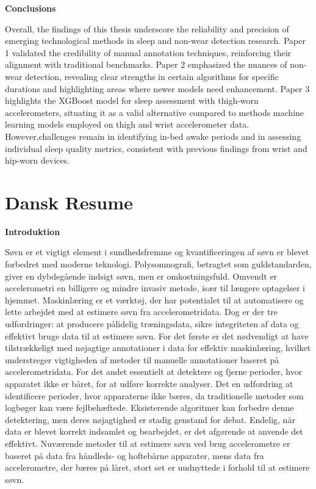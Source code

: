 \documentclass[
  9pt,
]{scrbook}
\begin{document}
\textbf{Conclusions}

Overall, the findings of this thesis underscore the reliability and
precision of emerging technological methods in sleep and non-wear
detection research. Paper 1 validated the credibility of manual
annotation techniques, reinforcing their alignment with traditional
benchmarks. Paper 2 emphasized the nuances of non-wear detection,
revealing clear strengths in certain algorithms for specific durations
and highlighting areas where newer models need enhancement. Paper 3
highlights the XGBoost model for sleep assessment with thigh-worn
accelerometers, situating it as a valid alternative compared to methods
machine learning models employed on thigh and wrist accelerometer data.
However,challenges remain in identifying in-bed awake periods and in
assessing individual sleep quality metrics, consistent with previous
findings from wrist and hip-worn devices.

\hypertarget{dansk-resume}{%
\chapter{Dansk Resume}\label{dansk-resume}}

\textbf{Introduktion}

Søvn er et vigtigt element i sundhedsfremme og kvantificeringen af søvn
er blevet forbedret med moderne teknologi. Polysomnografi, betragtet som
guldstandarden, giver en dybdegående indsigt søvn, men er
omkostningsfuld. Omvendt er accelerometri en billigere og mindre invasiv
metode, især til længere optagelser i hjemmet. Maskinlæring er et
værktøj, der har potentialet til at automatisere og lette arbejdet med
at estimere søvn fra accelerometridata. Dog er der tre udfordringer: at
producere pålidelig træningsdata, sikre integriteten af data og
effektivt bruge data til at estimere søvn. For det første er det
nødvendigt at have tilstrækkeligt med nøjagtige annotationer i data for
effektiv maskinlæring, hvilket understreger vigtigheden af metoder til
manuelle annotationer baseret på accelerometridata. For det andet
essentielt at detektere og fjerne perioder, hvor apparatet ikke er
båret, for at udføre korrekte analyser. Det en udfordring at
identificere perioder, hvor apparaterne ikke bæres, da traditionelle
metoder som logbøger kan være fejlbehæftede. Eksisterende algoritmer kan
forbedre denne detektering, men deres nøjagtighed er stadig genstand for
debat. Endelig, når data er blevet korrekt indsamlet og bearbejdet, er
det afgørende at anvende det effektivt. Nuværende metoder til at
estimere søvn ved brug accelerometre er baseret på data fra håndleds- og
hoftebårne apparater, mens data fra accelerometre, der bæres på låret,
stort set er uudnyttede i forhold til at estimere søvn.
\end{document}
